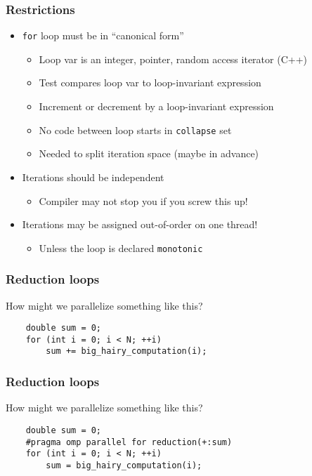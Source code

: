 \documentclass{beamer}
\begin{document}
\begin{frame}
  \frametitle{Restrictions}

  \begin{itemize}
  \item {\tt for} loop must be in ``canonical form''
    \begin{itemize}
    \item Loop var is an integer, pointer, random access iterator (C++)
    \item Test compares loop var to loop-invariant expression
    \item Increment or decrement by a loop-invariant expression
    \item No code between loop starts in {\tt collapse} set
    \item Needed to split iteration space (maybe in advance)
    \end{itemize}
  \item Iterations should be independent
    \begin{itemize}
    \item Compiler may not stop you if you screw this up!
    \end{itemize}
  \item Iterations may be assigned out-of-order on one thread!
    \begin{itemize}
    \item Unless the loop is declared {\tt monotonic}
    \end{itemize}
  \end{itemize}
\end{frame}


\begin{frame}[fragile]
  \frametitle{Reduction loops}

  How might we parallelize something like this?
  \begin{lstlisting}
    double sum = 0;
    for (int i = 0; i < N; ++i)
        sum += big_hairy_computation(i);
  \end{lstlisting}
\end{frame}


\begin{frame}[fragile]
  \frametitle{Reduction loops}

  How might we parallelize something like this?
  \begin{lstlisting}
    double sum = 0;
    #pragma omp parallel for reduction(+:sum)
    for (int i = 0; i < N; ++i)
        sum = big_hairy_computation(i);
  \end{lstlisting}
\end{frame}
\end{document}
